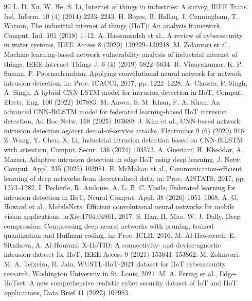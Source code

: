 \documentclass[12pt,a4paper]{article}
\begin{document}
\begin{thebibliography}{99}
 L. D. Xu, W. He, S. Li, Internet of things in industries: A survey, IEEE Trans. Ind. Inform. 10 (4) (2014) 2233--2243.
 H. Boyes, B. Hallaq, J. Cunningham, T. Watson, The industrial internet of things (IIoT): An analysis framework, Comput. Ind. 101 (2018) 1--12.
 A. Hassanzadeh et al., A review of cybersecurity in water systems, IEEE Access 8 (2020) 139229--139248.
 M. Zolanvari et al., Machine learning-based network vulnerability analysis of industrial internet of things, IEEE Internet Things J. 6 (4) (2019) 6822--6834.
 R. Vinayakumar, K. P. Soman, P. Poornachandran, Applying convolutional neural network for network intrusion detection, in: Proc. ICACCI, 2017, pp. 1222--1228.
 A. Chawla, P. Singh, A. Singh, A hybrid CNN-LSTM model for intrusion detection in IIoT, Comput. Electr. Eng. 100 (2022) 107883.
 M. Anwer, S. M. Khan, F. A. Khan, An advanced CNN-BiLSTM model for federated learning-based IIoT intrusion detection, Ad Hoc Netw. 168 (2025) 103689.
 J. Kim et al., CNN-based network intrusion detection against denial-of-service attacks, Electronics 9 (6) (2020) 916.
 Z. Wang, Y. Chen, X. Li, Industrial intrusion detection based on CNN-BiLSTM with attention, Comput. Secur. 136 (2024) 103573.
 A. Gueriani, H. Kheddar, A. Mazari, Adaptive intrusion detection in edge IIoT using deep learning, J. Netw. Comput. Appl. 235 (2025) 103981.
 B. McMahan et al., Communication-efficient learning of deep networks from decentralized data, in: Proc. AISTATS, 2017, pp. 1273--1282.
 I. Pecherle, R. Andonie, A. L. B. C. Vasile, Federated learning for intrusion detection in IIoT, Neural Comput. Appl. 38 (2026) 1051--1068.
 A. G. Howard et al., MobileNets: Efficient convolutional neural networks for mobile vision applications, arXiv:1704.04861, 2017.
 S. Han, H. Mao, W. J. Dally, Deep compression: Compressing deep neural networks with pruning, trained quantization and Huffman coding, in: Proc. ICLR, 2016.
 M. Al-Hawawreh, E. Sitnikova, A. Al-Hourani, X-IIoTID: A connectivity- and device-agnostic intrusion dataset for IIoT, IEEE Access 9 (2021) 153841--153862.
 M. Zolanvari, M. A. Teixeira, R. Jain, WUSTL-IIoT-2021 dataset for IIoT cybersecurity research, Washington University in St. Louis, 2021.
 M. A. Ferrag et al., Edge-IIoTset: A new comprehensive realistic cyber security dataset of IoT and IIoT applications, Data Brief 41 (2022) 107983.
\end{thebibliography}
\end{document}
